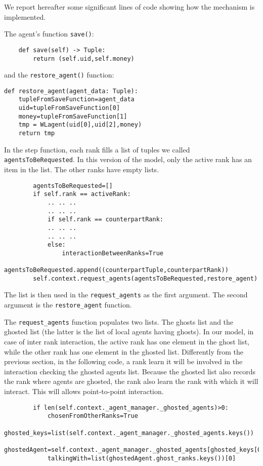 \documentclass{article}
\begin{document}
We report hereafter some significant lines of code showing how the mechanism is implemented.

The agent's function \verb+save()+:

\begin{verbatim}
    def save(self) -> Tuple:
        return (self.uid,self.money)
\end{verbatim}

and the \verb+restore_agent()+ function:

\begin{verbatim}
def restore_agent(agent_data: Tuple):
    tupleFromSaveFunction=agent_data
    uid=tupleFromSaveFunction[0]
    money=tupleFromSaveFunction[1]
    tmp = WLagent(uid[0],uid[2],money)
    return tmp
\end{verbatim}


In the step function, each rank fills a list of tuples we called \verb+agentsToBeRequested+.
In this version of the model, only the active rank has an item in the list. The other ranks have empty lists.

\begin{verbatim}
        agentsToBeRequested=[]
        if self.rank == activeRank:
            .. .. ..
            .. .. ..
            if self.rank == counterpartRank:
            .. .. ..
            .. .. ..
            else:
                interactionBetweenRanks=True
                agentsToBeRequested.append((counterpartTuple,counterpartRank))
        self.context.request_agents(agentsToBeRequested,restore_agent)
\end{verbatim}
The list is then used in the \verb+request_agents+ as the first argument. The second argument is the \verb+restore_agent+ function.

The \verb+request_agents+ function populates two lists. The ghosts list and the ghosted list (the latter is the list of local agents having ghosts). 
In our model, in case of inter rank interaction, the active rank has one element in the ghost list, while the other rank has one element in the ghosted list.
Differently from the previous section, in the following code, a rank learn it will be involved in the interaction checking the ghosted agents list. Because the ghosted list also records the rank where agents are ghosted, the rank also learn the rank with which it will interact. This will allows point-to-point interaction.

\begin{verbatim}
        if len(self.context._agent_manager._ghosted_agents)>0:
            chosenFromOtherRanks=True
            ghosted_keys=list(self.context._agent_manager._ghosted_agents.keys())
            ghostedAgent=self.context._agent_manager._ghosted_agents[ghosted_keys[0]]
            talkingWith=list(ghostedAgent.ghost_ranks.keys())[0]
\end{verbatim}
\end{document}
